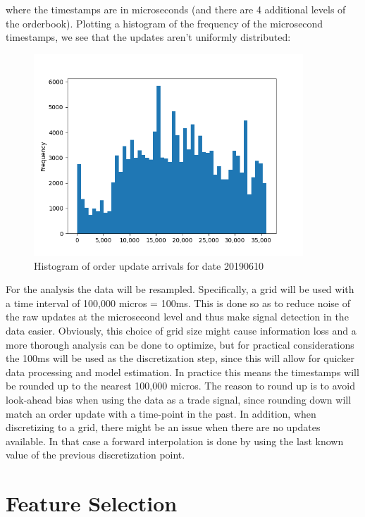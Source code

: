 \documentclass[english, 11pt, a4paper]{article}
\begin{document}
where the timestamps are in microseconds (and there are 4 additional levels of the orderbook).
Plotting a histogram of the frequency of the microsecond timestamps,
we see that the updates aren't uniformly distributed: 

 \begin{figure}[H] 
	\centering
	\includegraphics[width=0.90\textwidth]{../data/figures/hist_20190610_timestamps.png}
	\caption{Histogram of order update arrivals for date 20190610}
	\label{fig1}
\end{figure}

For the analysis the data will be resampled. Specifically, a grid will be used with a time interval of
100,000 micros = 100ms. This is done so as to reduce noise of the raw updates at the microsecond
level and thus make signal detection in the data easier. Obviously, this choice of grid size might cause information loss and a more thorough
analysis can be done to optimize, but for practical considerations the 100ms will be used as the
discretization step, since this will allow for quicker data processing and model estimation. 
In practice this means the timestamps will be rounded up to the nearest 100,000 micros.
The reason to round up is to avoid look-ahead bias when using the data as a trade signal, since
rounding down will match an order update with a time-point in the past. In addition, when
discretizing to a grid, there might be an issue when there are no updates available. In that case a
forward interpolation is done by using the last known value of the previous discretization point.

\section{Feature Selection}
\end{document}

